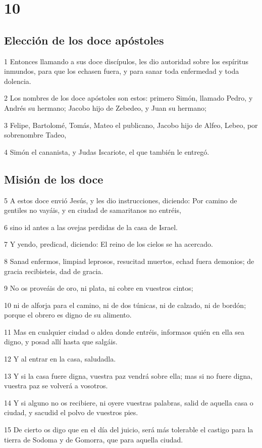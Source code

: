 \chapter{10}

\section*{Elección de los doce apóstoles}

\par 1 Entonces llamando a sus doce discípulos, les dio autoridad sobre los espíritus inmundos, para que los echasen fuera, y para sanar toda enfermedad y toda dolencia.
\par 2 Los nombres de los doce apóstoles son estos: primero Simón, llamado Pedro, y Andrés su hermano; Jacobo hijo de Zebedeo, y Juan su hermano;
\par 3 Felipe, Bartolomé, Tomás, Mateo el publicano, Jacobo hijo de Alfeo, Lebeo, por sobrenombre Tadeo,
\par 4 Simón el cananista, y Judas Iscariote, el que también le entregó.

\section*{Misión de los doce}

\par 5 A estos doce envió Jesús, y les dio instrucciones, diciendo: Por camino de gentiles no vayáis, y en ciudad de samaritanos no entréis,
\par 6 sino id antes a las ovejas perdidas de la casa de Israel.
\par 7 Y yendo, predicad, diciendo: El reino de los cielos se ha acercado.
\par 8 Sanad enfermos, limpiad leprosos, resucitad muertos, echad fuera demonios; de gracia recibisteis, dad de gracia.
\par 9 No os proveáis de oro, ni plata, ni cobre en vuestros cintos;
\par 10 ni de alforja para el camino, ni de dos túnicas, ni de calzado, ni de bordón; porque el obrero es digno de su alimento.
\par 11 Mas en cualquier ciudad o aldea donde entréis, informaos quién en ella sea digno, y posad allí hasta que salgáis.
\par 12 Y al entrar en la casa, saludadla.
\par 13 Y si la casa fuere digna, vuestra paz vendrá sobre ella; mas si no fuere digna, vuestra paz se volverá a vosotros.
\par 14 Y si alguno no os recibiere, ni oyere vuestras palabras, salid de aquella casa o ciudad, y sacudid el polvo de vuestros pies.
\par 15 De cierto os digo que en el día del juicio, será más tolerable el castigo para la tierra de Sodoma y de Gomorra, que para aquella ciudad.

